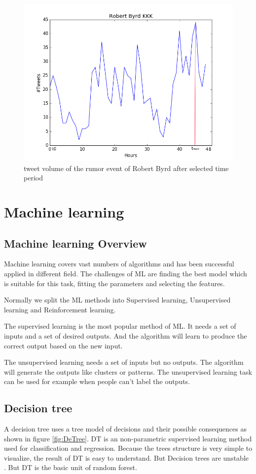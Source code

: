 \begin{figure}[!h]
\centering
\includegraphics[width=0.7\columnwidth]{images/Robert_Byrd_KKK.png}
\caption{tweet volume of the rumor event of Robert Byrd after selected time period}
\label{fig:KKK_part}
\end{figure}



\section{Machine learning } %
\label{sec:Maschine_learning}
\subsection{Machine learning Overview} %

 Machine learning covers vast numbers of algorithms and has been successful applied in different field. The challenges of ML are finding the best model which is suitable for this task, fitting the parameters and selecting the features. 
 
Normally we split the ML methods into Supervised learning, Unsupervised learning and Reinforcement learning\cite{russell2003artificial}. 

The supervised learning is the most popular method of ML. It needs a set of inputs and a set of desired outputs. And the algorithm will learn to produce the correct output based on the new input. 

The unsupervised learning needs a set of inputs but no outputs. The algorithm will generate the outputs like clusters or patterns. The unsupervised learning task can be used for example when people can't label the outputs. 
\subsection{ Decision tree} %
A decision tree uses a tree model of decisions and their possible consequences as shown in figure \ref{fig:DeTree}.  DT is an non-parametric supervised learning method used for classification and regression. Because the trees structure is very simple to visualize, the result of DT is easy to understand. But Decision trees are unstable \cite{breiman1996bagging}. But DT is the basic unit of random forest.

